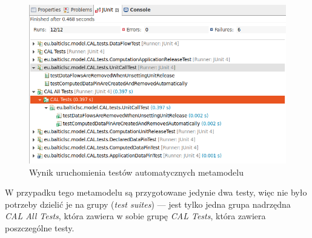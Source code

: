 \begin{figure}[!hb]
	\centering

	\includegraphics[width=0.90\linewidth]{./images/sirius-desktop-metamodel-tests.png}
	\caption{Wynik uruchomienia testów automatycznych
  metamodelu}\label{rys:sirius-desktop-metamodel-tests}
\end{figure}

W przypadku tego metamodelu są przygotowane
jedynie dwa testy, więc nie było potrzeby dzielić je na grupy
(\emph{test suites}) --- jest tylko
jedna grupa nadrzędna \emph{CAL All Tests}, która
zawiera w sobie grupę
\emph{CAL Tests}, która zawiera poszczególne testy.

